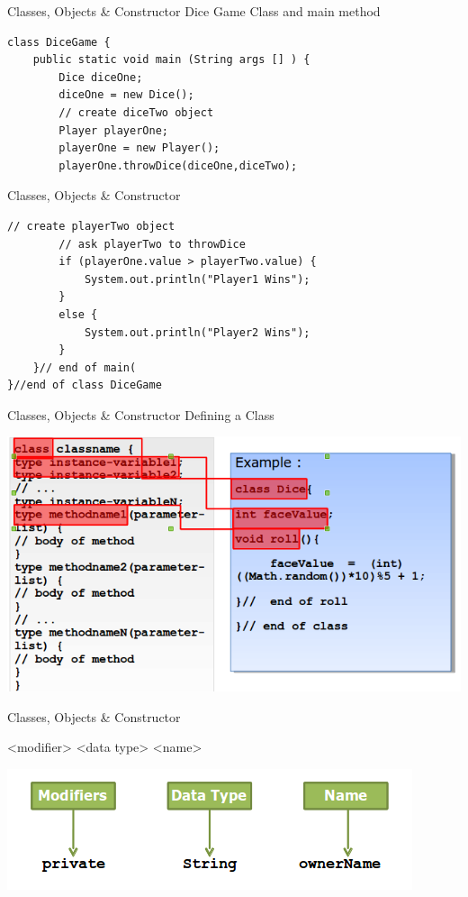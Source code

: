 \documentclass[14pt]{beamer}
\begin{document}
\begin{frame}[fragile]{Classes, Objects \& Constructor}
Dice Game Class and main method
\begin{lstlisting}[numbers=none]
class DiceGame {
    public static void main (String args [] ) {
        Dice diceOne;
        diceOne = new Dice();
        // create diceTwo object
        Player playerOne;
        playerOne = new Player();
        playerOne.throwDice(diceOne,diceTwo);
\end{lstlisting}
\end{frame}        
\begin{frame}[fragile]{Classes, Objects \& Constructor}
\begin{lstlisting}[numbers=none]
        // create playerTwo object
        // ask playerTwo to throwDice
        if (playerOne.value > playerTwo.value) {
            System.out.println("Player1 Wins");
        }
        else {
            System.out.println("Player2 Wins");
        }
    }// end of main(
}//end of class DiceGame
\end{lstlisting}
\end{frame}
\begin{frame}{Classes, Objects \& Constructor}
Defining a Class
\begin{center}
            \includegraphics[scale=0.5]{COJ-M01-S03-Image11.png}
                                \end{center}
\end{frame}

\begin{frame}{Classes, Objects \& Constructor}
\begin{block}{}
    <modifier>   <data type>    <name> 
\end{block}

\begin{center}
    \includegraphics[scale=0.5]{COJ-M01-S03-Image12.png}
    \end{center}
\end{frame}
\end{document}
